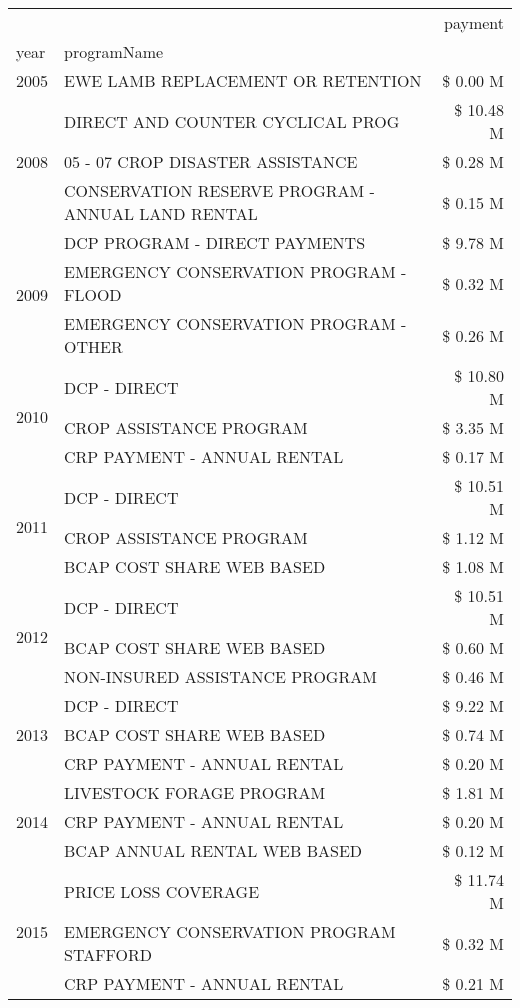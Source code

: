 \begin{tabular}{llr}
\toprule
 &  & payment \\
year & programName &  \\
\midrule
2005 & EWE LAMB REPLACEMENT OR RETENTION & \$ 0.00 M \\
\cline{1-3}
\multirow[t]{3}{*}{2008} & DIRECT AND COUNTER CYCLICAL PROG & \$ 10.48 M \\
 & 05 - 07 CROP DISASTER ASSISTANCE & \$ 0.28 M \\
 & CONSERVATION RESERVE PROGRAM - ANNUAL LAND RENTAL & \$ 0.15 M \\
\cline{1-3}
\multirow[t]{3}{*}{2009} & DCP PROGRAM - DIRECT PAYMENTS & \$ 9.78 M \\
 & EMERGENCY CONSERVATION PROGRAM - FLOOD & \$ 0.32 M \\
 & EMERGENCY CONSERVATION PROGRAM - OTHER & \$ 0.26 M \\
\cline{1-3}
\multirow[t]{3}{*}{2010} & DCP - DIRECT & \$ 10.80 M \\
 & CROP ASSISTANCE PROGRAM & \$ 3.35 M \\
 & CRP PAYMENT - ANNUAL RENTAL & \$ 0.17 M \\
\cline{1-3}
\multirow[t]{3}{*}{2011} & DCP - DIRECT & \$ 10.51 M \\
 & CROP ASSISTANCE PROGRAM & \$ 1.12 M \\
 & BCAP COST SHARE WEB BASED & \$ 1.08 M \\
\cline{1-3}
\multirow[t]{3}{*}{2012} & DCP - DIRECT & \$ 10.51 M \\
 & BCAP COST SHARE WEB BASED & \$ 0.60 M \\
 & NON-INSURED ASSISTANCE PROGRAM & \$ 0.46 M \\
\cline{1-3}
\multirow[t]{3}{*}{2013} & DCP - DIRECT & \$ 9.22 M \\
 & BCAP COST SHARE WEB BASED & \$ 0.74 M \\
 & CRP PAYMENT - ANNUAL RENTAL & \$ 0.20 M \\
\cline{1-3}
\multirow[t]{3}{*}{2014} & LIVESTOCK FORAGE PROGRAM & \$ 1.81 M \\
 & CRP PAYMENT - ANNUAL RENTAL & \$ 0.20 M \\
 & BCAP ANNUAL RENTAL WEB BASED & \$ 0.12 M \\
\cline{1-3}
\multirow[t]{3}{*}{2015} & PRICE LOSS COVERAGE & \$ 11.74 M \\
 & EMERGENCY CONSERVATION PROGRAM STAFFORD & \$ 0.32 M \\
 & CRP PAYMENT - ANNUAL RENTAL & \$ 0.21 M \\

\end{tabular}
